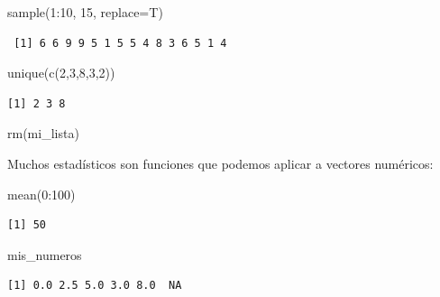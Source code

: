 \documentclass[
  letterpaper,
  DIV=11,
  numbers=noendperiod]{scrartcl}
\newenvironment{Shaded}{\begin{snugshade}}{\end{snugshade}}
\newcommand{\AttributeTok}[1]{\textcolor[rgb]{0.40,0.45,0.13}{#1}}
\newcommand{\DecValTok}[1]{\textcolor[rgb]{0.68,0.00,0.00}{#1}}
\newcommand{\FunctionTok}[1]{\textcolor[rgb]{0.28,0.35,0.67}{#1}}
\newcommand{\NormalTok}[1]{\textcolor[rgb]{0.00,0.23,0.31}{#1}}
\newcommand{\SpecialCharTok}[1]{\textcolor[rgb]{0.37,0.37,0.37}{#1}}
\begin{document}
\begin{Shaded}
\begin{Highlighting}[]
\FunctionTok{sample}\NormalTok{(}\DecValTok{1}\SpecialCharTok{:}\DecValTok{10}\NormalTok{, }\DecValTok{15}\NormalTok{, }\AttributeTok{replace=}\NormalTok{T) }
\end{Highlighting}
\end{Shaded}

\begin{verbatim}
 [1] 6 6 9 9 5 1 5 5 4 8 3 6 5 1 4
\end{verbatim}

\begin{Shaded}
\begin{Highlighting}[]
\FunctionTok{unique}\NormalTok{(}\FunctionTok{c}\NormalTok{(}\DecValTok{2}\NormalTok{,}\DecValTok{3}\NormalTok{,}\DecValTok{8}\NormalTok{,}\DecValTok{3}\NormalTok{,}\DecValTok{2}\NormalTok{)) }
\end{Highlighting}
\end{Shaded}

\begin{verbatim}
[1] 2 3 8
\end{verbatim}

\begin{Shaded}
\begin{Highlighting}[]
\FunctionTok{rm}\NormalTok{(mi\_lista)}
\end{Highlighting}
\end{Shaded}

Muchos estadísticos son funciones que podemos aplicar a vectores
numéricos:

\begin{Shaded}
\begin{Highlighting}[]
\FunctionTok{mean}\NormalTok{(}\DecValTok{0}\SpecialCharTok{:}\DecValTok{100}\NormalTok{) }
\end{Highlighting}
\end{Shaded}

\begin{verbatim}
[1] 50
\end{verbatim}

\begin{Shaded}
\begin{Highlighting}[]
\NormalTok{mis\_numeros}
\end{Highlighting}
\end{Shaded}

\begin{verbatim}
[1] 0.0 2.5 5.0 3.0 8.0  NA
\end{verbatim}
\end{document}
